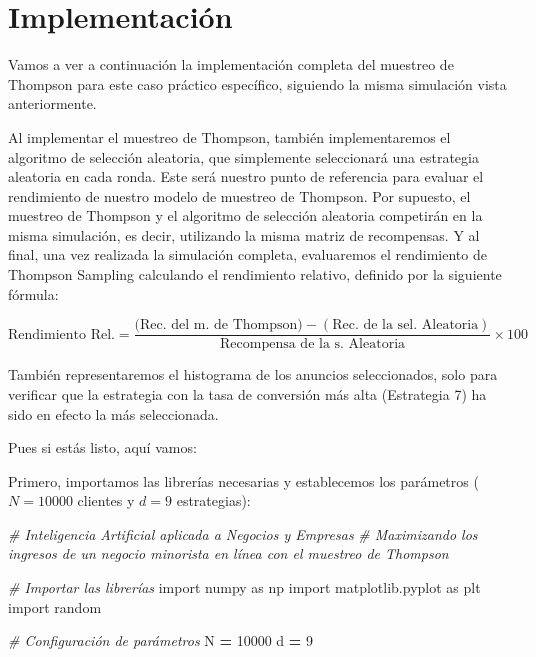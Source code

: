 \documentclass[
]{book}
\newenvironment{Shaded}{\begin{snugshade}}{\end{snugshade}}
\newcommand{\CommentTok}[1]{\textcolor[rgb]{0.56,0.35,0.01}{\textit{#1}}}
\newcommand{\DecValTok}[1]{\textcolor[rgb]{0.00,0.00,0.81}{#1}}
\newcommand{\ImportTok}[1]{#1}
\newcommand{\NormalTok}[1]{#1}
\newcommand{\OperatorTok}[1]{\textcolor[rgb]{0.81,0.36,0.00}{\textbf{#1}}}
\begin{document}
\hypertarget{implementaciuxf3n-1}{%
\section{Implementación}\label{implementaciuxf3n-1}}

Vamos a ver a continuación la implementación completa del muestreo de Thompson para este caso práctico específico, siguiendo la misma simulación vista anteriormente.

Al implementar el muestreo de Thompson, también implementaremos el algoritmo de selección aleatoria, que simplemente seleccionará una estrategia aleatoria en cada ronda. Este será nuestro punto de referencia para evaluar el rendimiento de nuestro modelo de muestreo de Thompson. Por supuesto, el muestreo de Thompson y el algoritmo de selección aleatoria competirán en la misma simulación, es decir, utilizando la misma matriz de recompensas. Y al final, una vez realizada la simulación completa, evaluaremos el rendimiento de Thompson Sampling calculando el rendimiento relativo, definido por la siguiente fórmula:

\[\textrm{Rendimiento Rel.} = \frac{\textrm{(Rec. del m. de Thompson)} - (\textrm{Rec. de la sel. Aleatoria})}{\textrm{Recompensa de la s. Aleatoria}} \times 100\]

También representaremos el histograma de los anuncios seleccionados, solo para verificar que la estrategia con la tasa de conversión más alta (Estrategia 7) ha sido en efecto la más seleccionada.

Pues si estás listo, aquí vamos:

Primero, importamos las librerías necesarias y establecemos los parámetros (\(N = 10000\) clientes y \(d = 9\) estrategias):

\begin{Shaded}
\begin{Highlighting}[]
\CommentTok{\# Inteligencia Artificial aplicada a Negocios y Empresas}
\CommentTok{\# Maximizando los ingresos de un negocio minorista en línea con el muestreo de Thompson}

\CommentTok{\# Importar las librerías}
\ImportTok{import}\NormalTok{ numpy }\ImportTok{as}\NormalTok{ np}
\ImportTok{import}\NormalTok{ matplotlib.pyplot }\ImportTok{as}\NormalTok{ plt}
\ImportTok{import}\NormalTok{ random}

\CommentTok{\# Configuración de parámetros}
\NormalTok{N }\OperatorTok{=} \DecValTok{10000}
\NormalTok{d }\OperatorTok{=} \DecValTok{9}
\end{Highlighting}
\end{Shaded}
\end{document}
